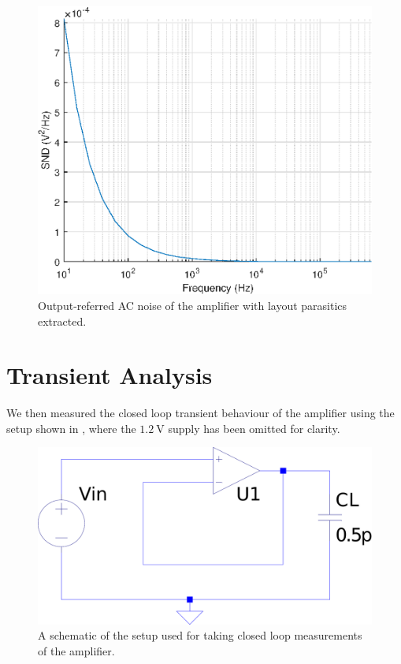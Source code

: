 \documentclass[journal,hidelinks]{IEEEtran}
\begin{document}
\begin{figure}[!htb]
  \centering
  \includegraphics[width=\columnwidth]{figures/layout/ac_noise.eps}
  \caption{Output-referred AC noise of the amplifier with layout parasitics extracted.}
  \label{fig:lay_ac_noise}
\end{figure}

\section{Transient Analysis}

We then measured the closed loop transient behaviour of the amplifier using the setup shown in , where the $\SI{1.2}{\volt}$ supply has been omitted for clarity.

\begin{figure}[!htb]
  \centering
  \includegraphics[width=\columnwidth]{schematics/closed-loop-setup.pdf}
  \caption{A schematic of the setup used for taking closed loop measurements of the amplifier.}
  \label{fig:closed-loop-setup}
\end{figure}
\end{document}
